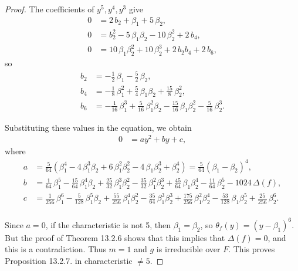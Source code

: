 \documentclass[11pt,a4paper]{article}
\begin{document}
\begin{proof}
The coefficients of $y^5,y^4,y^3$ give
\begin{align*}
0 &=2 \, b_{2} + \beta_{1} + 5 \, \beta_{2},\\
0 &= b_{2}^{2} - 5 \,\beta_{1} \beta_{2} - 10 \, \beta_{2}^{2} + 2 \, b_{4},\\
0&=  10 \, \beta_{1}\beta_{2}^{2} + 10 \, \beta_{2}^{3} + 2 \, b_{2} b_{4} + 2 \,b_{6},
\end{align*}
so
\begin{align*}
b_{2} &= -\frac{1}{2} \, \beta_{1} - \frac{5}{2} \,
\beta_{2},\\
 b_{4} &= -\frac{1}{8} \, \beta_{1}^{2} + \frac{5}{4} \,
\beta_{1} \beta_{2} + \frac{15}{8} \, \beta_{2}^{2},\\
 b_{6} &=
-\frac{1}{16} \, \beta_{1}^{3} + \frac{5}{16} \, \beta_{1}^{2} \beta_{2}
- \frac{15}{16} \, \beta_{1} \beta_{2}^{2} - \frac{5}{16} \,
\beta_{2}^{3}.
\end{align*}

Substituting these values in  the equation, we obtain
\begin{align*}
0 &= a y^2 + by +c,
\end{align*}
where
\begin{align*}
a &= \frac{5}{64}(\beta_{1}^{4} - 4 \, \beta_{1}^{3} \beta_{2} + 6 \, \beta_{1}^{2} \beta_{2}^{2} - 4 \, \beta_{1} \beta_{2}^{3} + \beta_{2}^{4})
 =  \frac{5}{64} (\beta_1 - \beta_2)^4,\\
b &= \frac{1}{64} \, \beta_{1}^{5} - \frac{15}{64} \, \beta_{1}^{4} \beta_{2}
+ \frac{25}{32} \, \beta_{1}^{3} \beta_{2}^{2} - \frac{35}{32} \,
\beta_{1}^{2} \beta_{2}^{3} + \frac{45}{64} \, \beta_{1} \beta_{2}^{4} -
\frac{11}{64} \, \beta_{2}^{5} - 1024 \, \Delta(f),\\
c&= \frac{1}{256} \, \beta_{1}^{6} - \frac{5}{128} \, \beta_{1}^{5}
\beta_{2} + \frac{55}{256} \, \beta_{1}^{4} \beta_{2}^{2} -
\frac{35}{64} \, \beta_{1}^{3} \beta_{2}^{3} + \frac{175}{256} \,
\beta_{1}^{2} \beta_{2}^{4} - \frac{53}{128} \, \beta_{1} \beta_{2}^{5}
+ \frac{25}{256} \, \beta_{2}^{6}.\\
\end{align*}

 Since $a=0$, if the characteristic is not 5, then $\beta_1 = \beta_2$, so $\theta_f(y) = (y-\beta_1)^6$. But the proof of Theorem 13.2.6 shows that this implies that $\Delta(f) = 0$, and this is a contradiction. Thus $m=1$ and $g$ is irreducible over $F$.  This proves Proposition 13.2.7. in characteristic $\ne 5$.
 

\end{proof}
\end{document}
